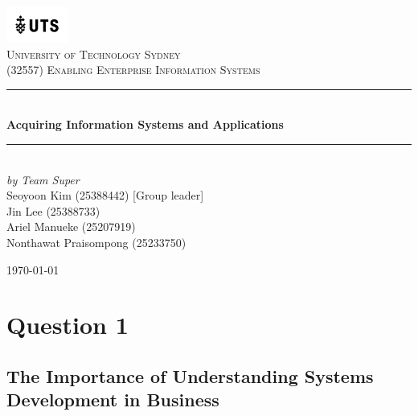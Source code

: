 \documentclass[12pt,a4paper]{article}
\begin{document}

\begin{titlepage}

\newcommand{\HRule}{\rule{\linewidth}{0.5mm}}
\center

\vspace*{1\baselineskip}
\includegraphics[width=0.15\textwidth]{images/UTS.png}\\
\textsc{\LARGE University of Technology Sydney}\\[2.0cm]
\textsc{\Large (32557) Enabling Enterprise Information Systems}\\[0.2cm]

\HRule\\[0.6cm]
{\huge\bfseries Acquiring Information Systems and Applications}\\[0.4cm]
\HRule\\[10cm]

\emph{by Team Super} \\
{ Seoyoon Kim (25388442) [Group leader] \\}
{ Jin Lee (25388733)  \\}
{ Ariel Manueke (25207919) \\}
{ Nonthawat Praisompong (25233750) \\}

\vfill
{\large\today}

\vfill

\end{titlepage}


\tableofcontents
\thispagestyle{nofooter}
\cleardoublepage

\pagebreak





\setcounter{page}{1}

\section{Question 1}
\subsection{The Importance of Understanding Systems Development in Business}
\label{sec:Question 1}
\end{document}
